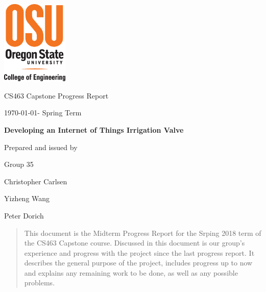 \documentclass[onecolumn, draftclsnofoot,10pt, compsoc]{IEEEtran}
\def \CapstoneTeamName{     Group}
\def \CapstoneTeamNumber{       35}
\def \GroupMemberOne{           Christopher Carlsen}
\def \GroupMemberTwo{           Yizheng Wang}
\def \GroupMemberThree{         Peter Dorich}
\def \CapstoneProjectName{      Developing an Internet of Things Irrigation Valve}
\def \CapstoneSponsorCompany{       OSU \textbar\hspace{.05in} Openly Published Environmental Sensing (OPEnS) Lab}
\def \CapstoneSponsorPerson{        Chet Udell}
\def \DocType{      %
    Progress Report
}
\newcommand{\NameSigPair}[1]{\par
    \makebox[2.75in][r]{#1} \hfil   \makebox[3.25in]{\makebox[2.25in]{\hrulefill} \hfill        \makebox[.75in]{\hrulefill}}
    \par\vspace{-12pt} \textit{\tiny\noindent
        \makebox[2.75in]{} \hfil        \makebox[3.25in]{\makebox[2.25in][r]{Signature} \hfill  \makebox[.75in][r]{Date}}}}
\renewcommand{\NameSigPair}[1]{#1}
\begin{document}
    \begin{titlepage}
        \begin{singlespace}
            \includegraphics[height=4cm]{coe_v_spot1}
            \hfill 
            \par\vspace{.2in}
            \centering
            \scshape{
                \huge CS463 Capstone \DocType \par
                {\large\today - Spring Term}\par
                \vspace{.5in}
                \textbf{\Huge\CapstoneProjectName}\par
                \vfill
                {\large Prepared and issued by }\par
                Group\CapstoneTeamNumber\par
                \vspace{5pt}
                {\Large
                    \NameSigPair{\GroupMemberOne}\par
                    \NameSigPair{\GroupMemberTwo}\par
                    \NameSigPair{\GroupMemberThree}\par
                }
                \vspace{20pt}
            }
            \begin{abstract}
                This document is the Midterm Progress Report for the Srping 2018 term of the CS463 Capstone course. Discussed in this document is our group's experience and progress with the project since the last progress report. It describes the general purpose of the project, includes progress up to now and explains any remaining work to be done, as well as any possible problems.
            \end{abstract}     
        \end{singlespace}
    \end{titlepage}
\end{document}
